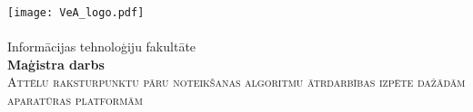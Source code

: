 \begin{titlepage}
	\newsavebox{\veatext}
	\newlength{\veatextwidth}
	\settowidth{\veatextwidth}{\usebox{\veatext}}
	\centering\texttt{[image: VeA\_logo.pdf]}\\[4pt]
	\usebox{\veatext}\\[6pt]
	\large Informācijas tehnoloģiju fakultāte\\[2cm]
	
	\textbf{Maģistra darbs}\\[1.5cm]
	
	\textsc{\Large Attēlu raksturpunktu pāru noteikšanas algoritmu ātrdarbības izpēte dažādām aparatūras platformām}
	\vfill %
	

\end{titlepage}
